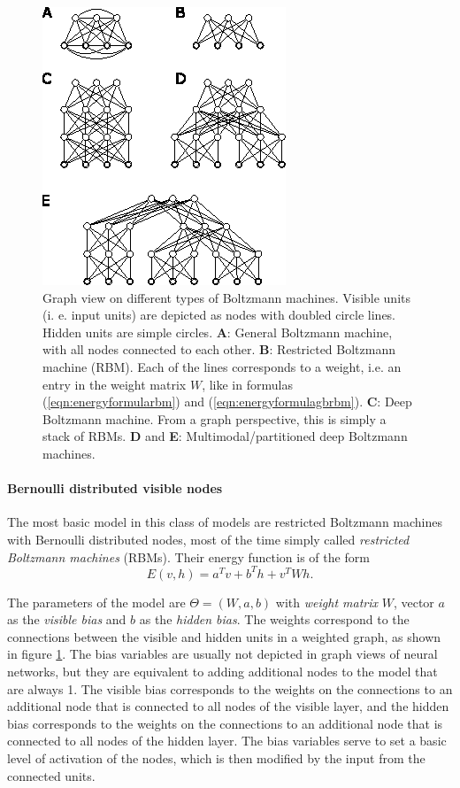 \documentclass[12pt]{article}
\begin{document}
\begin{figure}[h]

   \centering
   \includegraphics[scale=3.]{images/BMsOverview.eps}
   \caption{Graph view on different types of Boltzmann machines. Visible units (i. e. input units) are depicted as nodes with doubled circle lines. Hidden units are simple circles.
 {\bf A}: General Boltzmann machine, with all nodes connected to each other. {\bf B}: Restricted Boltzmann machine (RBM). Each of the lines corresponds to a weight, i.e. an entry in the weight matrix $W$, like in formulas (\ref{eqn:energyformularbm}) and (\ref{eqn:energyformulagbrbm}).  
{\bf C}: Deep Boltzmann machine. From a graph perspective, this is simply a stack of RBMs.
{\bf D} and {\bf E}: Multimodal/partitioned deep Boltzmann machines.}
   \label{fig:bmsoverview}
 \end{figure}


\paragraph{Bernoulli distributed visible nodes}
The most basic model in this class of models are restricted Boltzmann machines with Bernoulli distributed nodes, most of the time simply called \emph{restricted Boltzmann machines} (RBMs). Their energy function is of the form
\begin{equation}
   E(v,h) = a^T v + b^T h + v^T W h. \label{eqn:energyformularbm}
\end{equation}

The parameters of the model are $\Theta = (W, a, b)$ with \emph{weight matrix} $W$, vector $a$ as the \emph{visible bias} and $b$ as the \emph{hidden bias}.
The weights correspond to the connections between the visible and hidden units in a weighted graph, as shown in figure \ref{fig:bmsoverview}.
The bias variables are usually not depicted in graph views of neural networks, but they are equivalent to adding additional nodes to the model that are always 1. The visible bias corresponds to the weights on the connections to an additional node that is connected to all nodes of the visible layer, and the hidden bias corresponds to the weights on the connections to an additional node that is connected to all nodes of the hidden layer. The bias variables serve to set a basic level of activation of the nodes, which is then modified by the input from the connected units.
\end{document}
